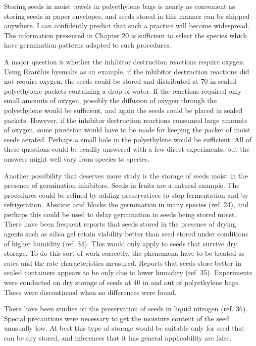 Storing seeds in moist towels in polyethylene bags is nearly as convenient as
storing seeds in paper envelopes, and seeds stored in this manner can be shipped
anywhere. I can confidently predict that such a practice will become widespread. The
information presented in Chapter 20 is sufficient to select the species which have
germination patterns adapted to such procedures.

A major question is whether the inhibitor destruction reactions require oxygen.
Using Eranthis hyemalis as an example, if the inhibitor destruction reactions did not
require oxygen, the seeds could be stored and distributed at 70 in sealed polyethylene
packets containing a drop of water. If the reactions required only small amounts of
oxygen, possibly the diffusion of oxygen through the polyethylene would be sufficient,
and again the seeds could be placed in sealed packets. However, if the inhibitor
destruction reactions consumed large amounts of oxygen, some provision would have
to be made for keeping the packet of moist seeds aerated. Perhaps a small hole in the
polyethylene would be sufficient. All of these questions could be readily answered
with a few direct experiments, but the answers might well vary from species to species.

Another possibility that deserves more study is the storage of seeds moist in the
presence of germination inhibitors. Seeds in fruits are a natural example. The
procedures could be refined by adding preservatives to stop fermentation and by
refrigeration. Abscicic acid blocks the germination in many species (ref. 24), and
perhaps this could be used to delay germination in seeds being stored moist.
There have been frequent reports that seeds stored in the presence of drying
agents such as silica gel retain viability better than seed stored under conditions of
higher humidity (ref. 34). This would only apply to seeds that survive dry storage. To
do this sort of work correctly, the phenomena have to be treated as rates and the rate
characteristics measured. Reports that seeds store better in sealed containers
appears to be only due to lower humidity (ref. 35). Experiments were conducted on
dry storage of seeds at 40 in and out of polyethylene bags. These were discontinued
when no differences were found.

There have been studies on the preservation of seeds in liquid nitrogen (ref.
36). Special precautions were necessary to get the moisture content of the seed
unusually low. At best this type of storage would be suitable only for seed that can be
dry stored, and inferences that it has general applicability are false.

